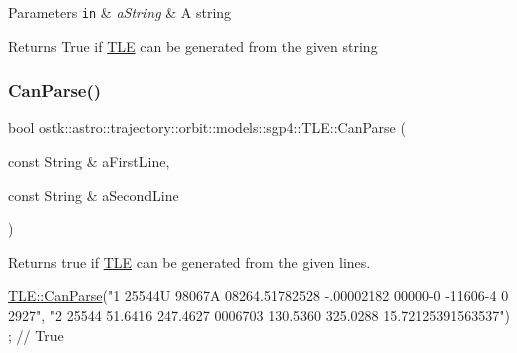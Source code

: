 \begin{DoxyParams}[1]{Parameters}
\mbox{\tt in}  & {\em a\+String} & A string \\
\hline
\end{DoxyParams}
\begin{DoxyReturn}{Returns}
True if \hyperlink{classostk_1_1astro_1_1trajectory_1_1orbit_1_1models_1_1sgp4_1_1_t_l_e}{T\+LE} can be generated from the given string 
\end{DoxyReturn}
\mbox{\label{classostk_1_1astro_1_1trajectory_1_1orbit_1_1models_1_1sgp4_1_1_t_l_e_a1e808cef2bd2466a8d7813f2c5d5bfc4}} 
\subsubsection{\texorpdfstring{Can\+Parse()}{CanParse()}\hspace{0.1cm}{\footnotesize\ttfamily [2/2]}}
{\footnotesize\ttfamily bool ostk\+::astro\+::trajectory\+::orbit\+::models\+::sgp4\+::\+T\+L\+E\+::\+Can\+Parse (\begin{DoxyParamCaption}\item[{const String \&}]{a\+First\+Line,  }\item[{const String \&}]{a\+Second\+Line }\end{DoxyParamCaption})\hspace{0.3cm}{\ttfamily [static]}}



Returns true if \hyperlink{classostk_1_1astro_1_1trajectory_1_1orbit_1_1models_1_1sgp4_1_1_t_l_e}{T\+LE} can be generated from the given lines. 


\begin{DoxyCode}
\hyperlink{classostk_1_1astro_1_1trajectory_1_1orbit_1_1models_1_1sgp4_1_1_t_l_e_a843f3432e8411de6b8d7e9c40d7191d2}{TLE::CanParse}(\textcolor{stringliteral}{"1 25544U 98067A   08264.51782528 -.00002182  00000-0 -11606-4 0  2927"},
              \textcolor{stringliteral}{"2 25544  51.6416 247.4627 0006703 130.5360 325.0288 15.72125391563537"}) ; \textcolor{comment}{// True}
\end{DoxyCode}



